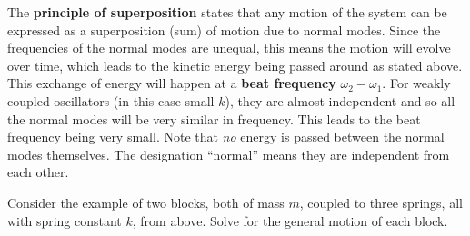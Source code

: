 \documentclass[../classical_mechanics.tex]{subfiles}
\begin{document}
        The \textbf{principle of superposition} states that any motion of the system can be expressed as a superposition (sum) of motion due to normal modes.
        Since the frequencies of the normal modes are unequal, this means the motion will evolve over time, which leads to the kinetic energy being passed around as stated above.
        This exchange of energy will happen at a \textbf{beat frequency} $\omega_2-\omega_1$.
        For weakly coupled oscillators (in this case small $k$), they are almost independent and so all the normal modes will be very similar in frequency.
        This leads to the beat frequency being very small.
        Note that \textit{no} energy is passed between the normal modes themselves.
        The designation ``normal'' means they are independent from each other.
        \begin{example}
            Consider the example of two blocks, both of mass $m$, coupled to three springs, all with spring constant $k$, from above.
            Solve for the general motion of each block.
            

\end{example}
\end{document}
